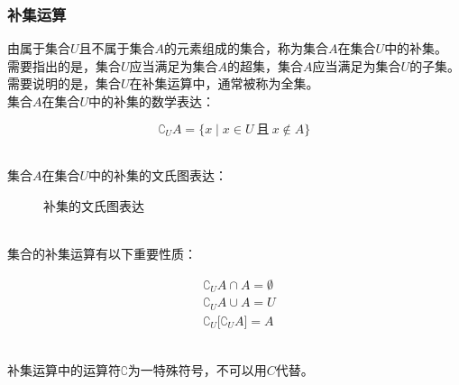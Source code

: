 \documentclass[UTF8]{ctexart}
\begin{document}
\subsubsection{补集运算}
    由属于集合$U$且不属于集合$A$的元素组成的集合，称为集合$A$在集合$U$中的补集。\\[3mm]
    需要指出的是，集合$U$应当满足为集合$A$的超集，集合$A$应当满足为集合$U$的子集。\\[3mm]
    需要说明的是，集合$U$在补集运算中，通常被称为全集。\\[4mm]
    集合$A$在集合$U$中的补集的数学表达：
    \begin{large}
        \begin{equation*}
            \complement_UA=\big\{ x\mid x\in U~\text{且}~x\notin A\big\}
        \end{equation*}
    \end{large}\\
    集合$A$在集合$U$中的补集的文氏图表达：\vspace{3pt}
    \begin{figure}[h]
        \begin{center}
            \caption{补集的文氏图表达}
        \end{center}
    \end{figure}\\
    集合的补集运算有以下重要性质：
    \begin{large}
        \begin{align*}
            &\complement_UA\cap A=\emptyset\\[6mm]
            &\complement_UA\cup A=U\\[6mm]
            &\complement_U\big[\complement_UA\big]=A
        \end{align*}
    \end{large}\\
    补集运算中的运算符$\complement$为一特殊符号，不可以用$C$代替。
\end{document}
